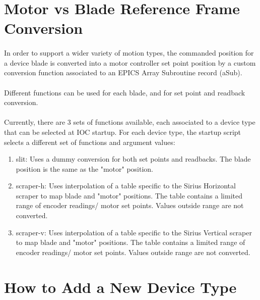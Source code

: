 \documentclass[openany]{article}
\begin{document}
\section{Motor vs Blade Reference Frame Conversion}\label{sec:ref-frame-conv}

    \paragraph{} In order to support a wider variety of motion types, the commanded position for a device blade is converted into a motor controller set point position by a custom conversion function associated to an EPICS Array Subroutine record (aSub).

    \paragraph{} Different functions can be used for each blade, and for set point and readback conversion.

    \paragraph{} Currently, there are 3 sets of functions available, each associated to a device type that can be selected at IOC startup. For each device type, the startup script selects a different set of functions and argument values:

    \begin{enumerate}
        \item slit: Uses a dummy conversion for both set points and readbacks. The blade position is the same as the "motor" position.
        \item scraper-h: Uses interpolation of a table specific to the Sirius Horizontal scraper to map blade and "motor" positions. The table contains a limited range of encoder readings/ motor set points. Values outside range are not converted.
        \item scraper-v: Uses interpolation of a table specific to the Sirius Vertical scraper to map blade and "motor" positions. The table contains a limited range of encoder readings/ motor set points. Values outside range are not converted.
    \end{enumerate}

\section{How to Add a New Device Type}
\end{document}
